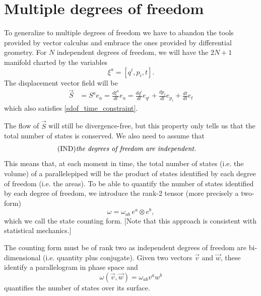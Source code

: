 \documentclass[fleqn,10pt]{wlscirep}
\begin{document}
\section*{Multiple degrees of freedom}

To generalize to multiple degrees of freedom we have to abandon the tools provided by vector calculus and embrace the ones provided by differential geometry. For $N$ independent degrees of freedom, we will have the $2N+1$ manifold charted by the variables
\begin{equation}\label{mdof_variables}
	\xi^a = [ q^i, p_i, t].
\end{equation}
The displacement vector field will be
\begin{equation}\label{mdof_displacement}
	\begin{aligned}
		\vec{S} &= S^a e_a = \frac{d\xi^a}{dt} e_a =\frac{dq^i}{dt} e_{q^i} + \frac{dp_i}{dt} e_{p_i} + \frac{dt}{dt} e_t
	\end{aligned}
\end{equation}
which also satisfies \ref{sdof_time_constraint}.

The flow of $\vec{S}$ will still be divergence-free, but this property only tells us that the total number of states is conserved. We also need to assume that
\begin{align}\label{assum_indep}
	\tag*{(IND)}
	\parbox{2.8in}{\emph{the degrees of freedom are independent.}}
\end{align}
This means that, at each moment in time, the total number of states (i.e. the volume) of a parallelepiped will be the product of states identified by each degree of freedom (i.e. the areas). To be able to quantify the number of states identified by each degree of freedom, we introduce the rank-2 tensor (more precisely a two-form)
\begin{equation}\label{mdof_form}
	\omega = \omega_{ab} \, e^a \otimes e^b,
\end{equation}
which we call the state counting form. [Note that this approach is consistent with statistical mechanics\cite{peliti2011statistical}.]

The counting form must be of rank two as independent degrees of freedom are bi-dimensional (i.e. quantity plus conjugate). Given two vectors $\vec{v}$ and $\vec{w}$, these identify a parallelogram in phase space and 
\begin{equation}\label{mdof_form_applied}
	\omega(\vec{v}, \vec{w}) = \omega_{ab} v^a w^b
\end{equation}
quantifies the number of states over its surface.
\end{document}
